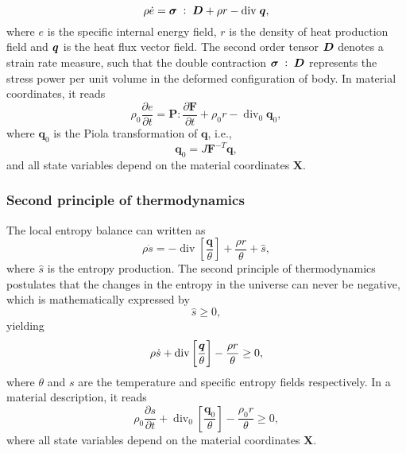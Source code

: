 \begin{equation} \label{eq:first_principle_thermo}
    \rho\dot e = \bm{\sigma}\;:\;\bm{D} + \rho r -\text{div}\;\bm{q},
\end{equation}
where $e$ is the specific internal energy field, $r$ is the density of heat production field and $\bm{q}$ is the heat flux vector field.
The second order tensor $\bm{D}$ denotes a strain rate measure, such that the double contraction $\bm{\sigma}\;:\;\bm{D}$ represents the stress power per unit volume in the deformed configuration of body.
In material coordinates, it reads
\begin{equation}
 \rho_0 \frac{\partial e}{\partial t} = \bm P :\frac{\partial\bm F}{\partial t} + \rho_0 r -\operatorname{div}_0 \bm q_0,
\end{equation}
where \(\bm q_0\) is the Piola transformation of \(\bm q\), i.e.,
\begin{equation}
  \bm q_0 = J \bm F^{-T} \bm q,
\end{equation}
and all state variables depend on the material coordinates \(\bm X\).

\subsubsection{Second principle of thermodynamics}

The local entropy balance can written as
\begin{equation}
  \rho \dot s = -\operatorname{div}\left[\frac{\bm q}{\theta}\right] + \frac{\rho r}{\theta} + \hat{s},
\end{equation}
where \(\hat{s}\) is the entropy production.
The second principle of thermodynamics postulates that the changes in the entropy in the universe can never be negative, which is mathematically expressed by
\begin{equation}
  \hat s \geq 0,
\end{equation}
yielding
\begin{equation}
    \rho\dot s +\text{div}\left[\frac{\bm{q}}{\theta}\right] -\frac{\rho r}{\theta} \geq 0,
\end{equation}
   where $\theta$ and $s$ are the temperature and specific entropy fields respectively.
In a material description, it reads
\begin{equation}
  \rho_0 \frac{\partial s}{\partial t} + \operatorname{div}_0 \left[\frac{\bm q_0}{\theta}\right] - \frac{\rho_0 r}{\theta} \geq 0,
\end{equation}
where all state variables depend on the material coordinates \(\bm X\).

